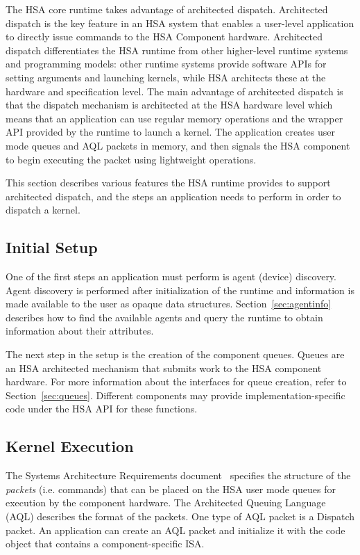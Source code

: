 \documentclass[final]{book}
\begin{document}
The HSA core runtime takes advantage of architected dispatch. Architected
dispatch is the key feature in an HSA system that enables a user-level
application to directly issue commands to the HSA Component hardware.
Architected dispatch differentiates the HSA runtime from other higher-level
runtime systems and programming models: other runtime systems provide
software APIs for setting arguments and launching kernels, while HSA architects
these at the hardware and specification level. The main advantage of architected
dispatch is that the dispatch mechanism is architected at the HSA hardware level
which means that an application can use regular memory operations and the
wrapper API provided by the runtime to launch a kernel. The application creates
user mode queues and AQL packets in memory, and then signals the HSA component
to begin executing the packet using lightweight operations.

This section describes various features the HSA runtime provides to support
architected dispatch, and the steps an application needs to perform in order to
dispatch a kernel.

\subsection{Initial Setup}
One of the first steps an application must perform is agent (device) discovery.
Agent discovery is performed after initialization of the runtime and information
is made available to the user as opaque data
structures. Section~\ref{sec:agentinfo} describes how to find the available
agents and query the runtime to obtain information about their attributes.

The next step in the setup is the creation of the component queues. Queues are an
HSA architected mechanism that submits work to the HSA component hardware. For
more information about the interfaces for queue creation, refer to
Section~\ref{sec:queues}. Different components may provide
implementation-specific code under the HSA API for these functions.


\subsection{Kernel Execution}
The Systems Architecture Requirements document~\cite{sar} specifies the
structure of the \emph{packets} (i.e. commands) that can be placed on the HSA
user mode queues for execution by the component hardware. The Architected
Queuing Language (AQL) describes the format of the packets. One type of
AQL packet is a Dispatch packet. An application can create an AQL packet
and initialize it with the code object that contains a component-specific ISA.
\end{document}
